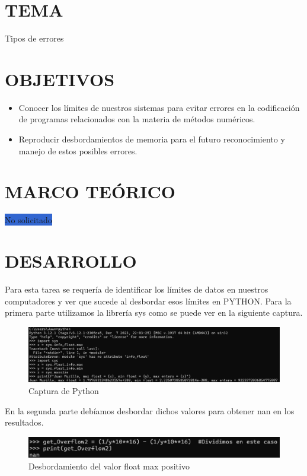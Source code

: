 \documentclass[12pt]{article}
\begin{document}
\section*{TEMA}
Tipos de errores
\vspace{0.5cm}

\section*{OBJETIVOS}
\begin{itemize}
    \item Conocer los límites de nuestros sistemas para evitar errores en la codificación de programas relacionados con la materia de métodos numéricos. 
    \item Reproducir desbordamientos de memoria para el futuro reconocimiento y manejo de estos posibles errores. 
\end{itemize}

\vspace{0.5cm}

\section*{MARCO TEÓRICO}
\colorbox{highlight}{No solicitado} 

\vspace{0.5cm}

\section*{DESARROLLO}
Para esta tarea se requería de identificar los límites de datos en nuestros computadores y ver que sucede al desbordar esos límites en PYTHON. 
Para la primera parte utilizamos la librería sys como se puede ver en la siguiente captura.


\begin{figure}[H]
\centering
\includegraphics[width=1\textwidth]{./inFiles/Figures/Cap1.png}
\caption{Captura de Python}
\end{figure}

En la segunda parte debíamos desbordar dichos valores para obtener nan en los resultados.
\begin{figure}[H]
\centering
\includegraphics[width=1\textwidth]{./inFiles/Figures/Cap2.png}
\caption{Desbordamiento del valor float max positivo}
\end{figure}
\end{document}
